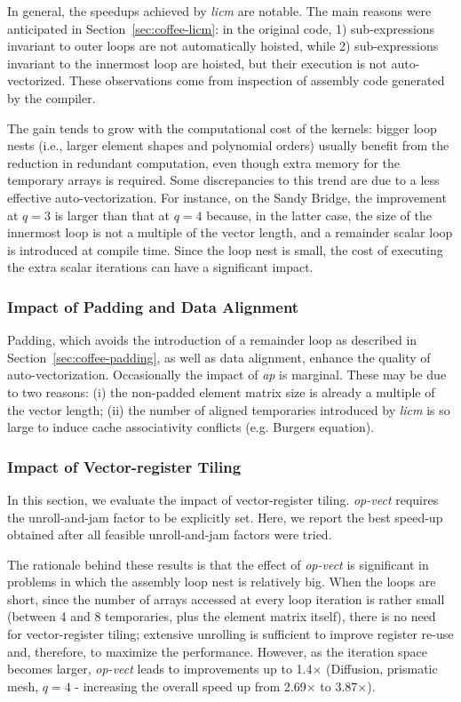 In general, the speedups achieved by \emph{licm} are notable. The main reasons were anticipated in Section~\ref{sec:coffee-licm}: in the original code, 1) sub-expressions invariant to outer loops are not automatically hoisted, while 2) sub-expressions invariant to the innermost loop are hoisted, but their execution is not auto-vectorized. These observations come from inspection of assembly code generated by the compiler.

The gain tends to grow with the computational cost of the kernels: bigger loop nests (i.e., larger element shapes and polynomial orders) usually benefit from the reduction in redundant computation, even though extra memory for the temporary arrays is required. Some discrepancies to this trend are due to a less effective auto-vectorization. For instance, on the Sandy Bridge, the improvement at $q=3$ is larger than that at $q=4$ because, in the latter case, the size of the innermost loop is not a multiple of the vector length, and a remainder scalar loop is introduced at compile time. Since the loop nest is small, the cost of executing the extra scalar iterations can have a significant impact.

\subsubsection{Impact of Padding and Data Alignment}
\label{sec:perf-eval-padding}

Padding, which avoids the introduction of a remainder loop as described in Section~\ref{sec:coffee-padding}, as well as data alignment, enhance the quality of auto-vectorization. Occasionally the impact of \emph{ap} is marginal. These may be due to two reasons: (i) the non-padded element matrix size is already a multiple of the vector length; (ii) the number of aligned temporaries introduced by \emph{licm} is so large to induce cache associativity conflicts (e.g. Burgers equation).

\subsubsection{Impact of Vector-register Tiling}
\label{sec:perf-eval-opvect}

In this section, we evaluate the impact of vector-register tiling. \emph{op-vect} requires the unroll-and-jam factor to be explicitly set. Here, we report the best speed-up obtained after all feasible unroll-and-jam factors were tried. 

The rationale behind these results is that the effect of \emph{op-vect} is significant in problems in which the assembly loop nest is relatively big. When the loops are short, since the number of arrays accessed at every loop iteration is rather small (between 4 and 8 temporaries, plus the element matrix itself), there is no need for
vector-register tiling; extensive unrolling is sufficient to improve register re-use and, therefore, to maximize the performance. However, as the iteration space becomes larger, \emph{op-vect} leads to improvements up to 1.4$\times$ (Diffusion, prismatic mesh, $q=4$ - increasing the overall speed up from 2.69$\times$ to 3.87$\times$).

